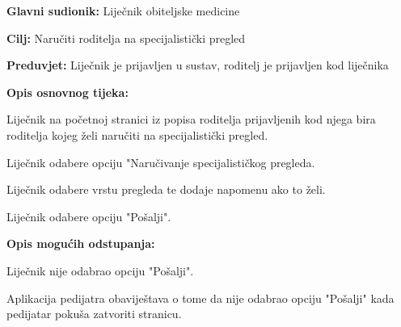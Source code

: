					\noindent {}
					\begin{packed_item}
						
						\item \textbf{Glavni sudionik: }Liječnik obiteljske medicine
						\item  \textbf{Cilj:} Naručiti roditelja na specijalistički pregled
						\item  \textbf{Preduvjet:} Liječnik je prijavljen u sustav, roditelj je prijavljen kod liječnika
						\item  \textbf{Opis osnovnog tijeka:}
						
						\item[] \begin{packed_enum}
							
							\item Liječnik na početnoj stranici iz popisa roditelja prijavljenih kod njega bira roditelja kojeg želi naručiti na specijalistički pregled.
							\item Liječnik odabere opciju "Naručivanje specijalističkog pregleda.
							\item Liječnik odabere vrstu pregleda te dodaje napomenu ako to želi.
							\item Liječnik odabere opciju "Pošalji".
						\end{packed_enum}
						
						\item  \textbf{Opis mogućih odstupanja:}
						
						\item[] \begin{packed_item}
							
							\item[4.a] Liječnik nije odabrao opciju "Pošalji".
							\item[] \begin{packed_enum}
								
								\item Aplikacija pedijatra obaviještava o tome da nije odabrao opciju "Pošalji" kada pedijatar pokuša zatvoriti stranicu.
							\end{packed_enum}
							
							
						\end{packed_item}
						
						
					\end{packed_item}
					
